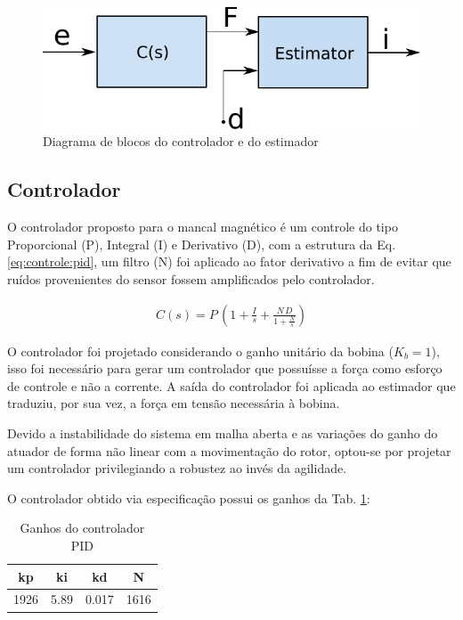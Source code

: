 \begin{figure}[ht!]
	\centering
	\includegraphics[width=0.5\linewidth]{Figs/Modelagem/controlador_estimador}
	\caption{Diagrama de blocos do controlador e do estimador}
	\label{fig:diagrama_controlador_estimador}
\end{figure}

\subsection{Controlador}

O controlador proposto para o mancal magnético é um controle do tipo Proporcional (P), Integral (I) e Derivativo (D), com a estrutura da Eq. \eqref{eq:controle:pid}, um filtro (N) foi aplicado ao fator derivativo a fim de evitar que ruídos provenientes do sensor fossem amplificados pelo controlador.

\begin{align}
	C(s) = P \, \left( 1 + \frac{I}{s} + \frac{N \, D}{ 1 + \frac{N}{s}} \right)
	\label{eq:controle:pid}
\end{align}

O controlador foi projetado considerando o ganho unitário da bobina ($K_b = 1$), isso foi necessário para gerar um controlador que possuísse a força como esforço de controle e não a corrente. A saída do controlador foi aplicada ao estimador que traduziu, por sua vez, a força em tensão necessária à bobina. 

Devido a instabilidade do sistema em malha aberta e as variações do ganho do atuador de forma não linear com a movimentação do rotor, optou-se por projetar um controlador privilegiando a robustez ao invés da agilidade.

O controlador obtido via especificação possui os ganhos da Tab. \ref{tab:controle:pid}:

\begin{table}[ht!]
\centering
	\begin{tabular}{c c c c}
	 kp  &  ki & kd &  N  \\
	 \hline \hline
		1926	 &	5.89	& 0.017	&1616
	\end{tabular} 
	\caption{Ganhos do controlador PID}
	\label{tab:controle:pid}
\end{table} 

